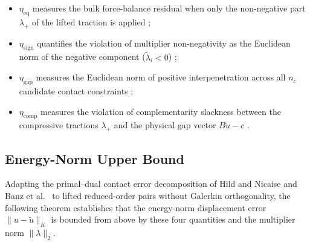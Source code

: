 \documentclass[11pt,a4paper]{article}
\providecommand{\tightlist}{\setlength{\itemsep}{0pt}\setlength{\parskip}{0pt}}
\begin{document}
\begin{itemize}
\tightlist
\item \(\eta_{\mathrm{eq}}\) measures the bulk force-balance residual when only the non-negative part \(\lambda_+\) of the lifted traction is applied \cite{hild2007residual};
\item \(\eta_{\mathrm{sign}}\) quantifies the violation of multiplier non-negativity as the Euclidean norm of the negative component (\(\tilde{\lambda}_i < 0\)) \cite{balajewicz2016projection, banz2026posteriori};
\item \(\eta_{\mathrm{gap}}\) measures the Euclidean norm of positive interpenetration across all \(n_c\) candidate contact constraints \cite{coorevits2000posteriori, hild2007residual};
\item \(\eta_{\mathrm{comp}}\) measures the violation of complementarity slackness between the compressive tractions \(\lambda_+\) and the physical gap vector \(B \tilde{u} - c\) \cite{dabaghi2020posteriori, banz2024generic}.
\end{itemize}

\hypertarget{certified-energy-norm-upper-bound}{%
\subsection{Energy-Norm Upper Bound}\label{certified-energy-norm-upper-bound}}

Adapting the primal--dual contact error decomposition of Hild and Nicaise \cite{hild2007residual} and Banz et al.~\cite{banz2024generic, banz2026posteriori} to lifted reduced-order pairs without Galerkin orthogonality, the following theorem establishes that the energy-norm displacement error \(\|u - \tilde{u}\|_K\) is bounded from above by these four quantities and the multiplier norm \(\|\lambda\|_2\).
\end{document}

